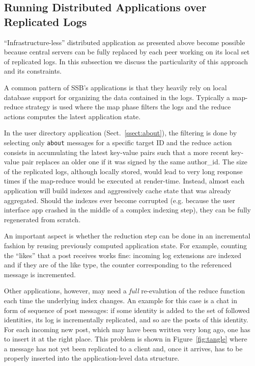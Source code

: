 \documentclass[9pt,sigconf]{acmart}
\begin{document}
\subsection{Running Distributed Applications over Replicated Logs}
\label{ssect:dapps}

``Infrastructure-less'' distributed application as presented above
become possible because central servers can be fully replaced by each
peer working on its local set of replicated logs. In this subsection
we discuss the particularity of this approach and its constraints.

A common pattern of SSB's applications is that they heavily rely on
local database support for organizing the data contained in the logs.
Typically a map-reduce strategy is used where the map phase filters
the logs and the reduce actions computes the latest application state.

In the user directory application (Sect.~\ref{ssect:about}), the
filtering is done by selecting only {\tt about} messages for a
specific target ID and the reduce action consists in accumulating the
latest key-value pairs such that a more recent key-value pair replaces
an older one if it was signed by the same author\_id. The size of the
replicated logs, although locally stored, would lead to very long
response times if the map-reduce would be executed at
render-time. Instead, almost each application will build indexes and
aggressively cache state that was already aggregated. Should the
indexes ever become corrupted (e.g. because the user interface app
crashed in the middle of a complex indexing step), they can be fully
regenerated from scratch.

An important aspect is whether the reduction step can be done in an
incremental fashion by reusing previously computed application state.
For example, counting the ``likes'' that a post receives works fine:
incoming log extensions are indexed and if they are of the like type,
the counter corresponding to the referenced message is incremented.

Other applications, however, may need a {\em full} re-evalution of the
reduce function each time the underlying index changes. An example for
this case is a chat in form of sequence of post messages: if some
identity is added to the set of followed identities, its log is
incrementally replicated, and so are the posts of this identity. For
each incoming new post, which may have been written very long ago, one
has to insert it at the right place. This problem is shown in
Figure~\ref{fig:tangle} where a message has not yet been replicated to
a client and, once it arrives, has to be properly inserted into the
application-level data structure.
\end{document}
